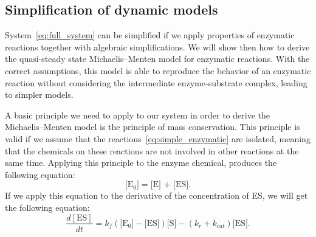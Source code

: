 \subsection{Simplification of dynamic models}
System~\ref{eq:full_system} can be simplified if we
apply properties of enzymatic reactions together with algebraic 
simplifications. We will show then how to derive the quasi-steady state 
Michaelis--Menten model for enzymatic reactions. With the correct 
assumptions, this model is able to reproduce the behavior of an 
enzymatic reaction without considering the intermediate enzyme-substrate 
complex, leading to simpler models.

A basic principle we need to apply to our system in order to derive
the Michaelis--Menten model is the principle of mass conservation. This 
principle is valid if we assume that the 
reactions~\ref{eq:simple_enzymatic} are isolated, meaning that the 
chemicals on these reactions are not involved in other reactions at the
same time. Applying this principle to the enzyme chemical, produces the
following equation:
\begin{equation*}
    \text{[E$_0$]} = \text{[E] + [ES]}.
    \label{eq:E_conservation}
\end{equation*}
If we apply this equation to the derivative of the concentration of ES,
we will get the following equation:
\begin{equation}
    \frac{d[\text{ES}]}{dt} =  
        k_f(\text{[E$_0$]} - \text{[ES]})\text{[S]} 
        - (k_r + k_{cat}) \text{[ES]}. 
        \label{eq:dESdt_2}
\end{equation}

